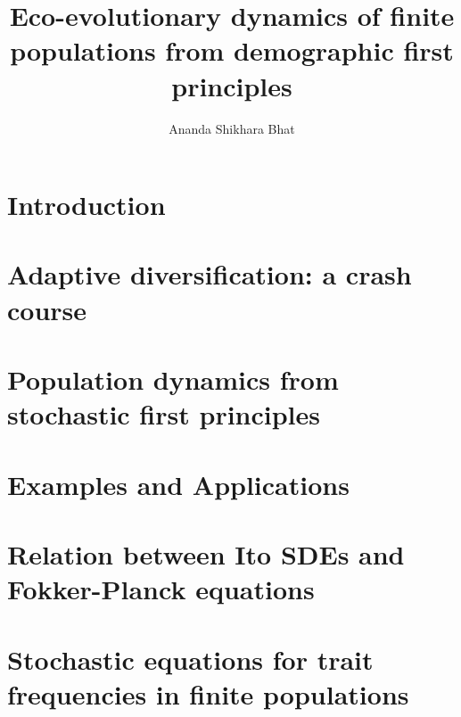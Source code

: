 \documentclass[twoside, 12pt]{iiser-thesis}
\title{Eco-evolutionary dynamics of finite populations from demographic first principles}
\author{Ananda Shikhara Bhat}
\begin{document}
\thesisfront
\listoftables
\listoffigures	
\chapter{Introduction}

\chapter{Adaptive diversification: a crash course}\label{chap_AD}

\chapter{Population dynamics from stochastic first principles}\label{chap_BD}

\chapter{Examples and Applications}\label{chap_examples}

% 
% 

\begin{appendices}
\chapter{Relation between Ito SDEs and Fokker-Planck equations}\label{App_SDE_FPE}

\chapter{Stochastic equations for trait frequencies in finite populations}\label{App_density_to_freq}

\end{appendices}

\printbibliography[title=References]
\end{document}
